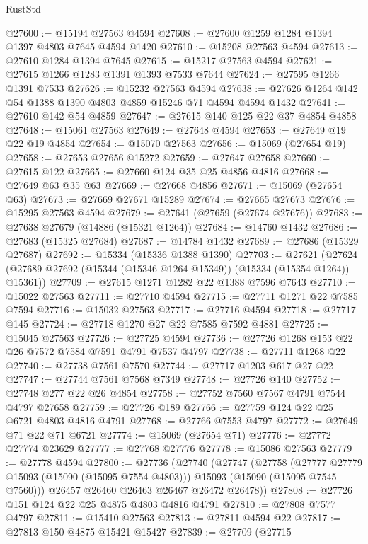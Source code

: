 \begin{lexlean}{RustStd}
\begin{coremodule}
@27600 := @15194 @27563 @4594
@27608 := @27600 @1259 @1284 @1394 @1397 @4803 @7645 @4594 @1420
@27610 := @15208 @27563 @4594
@27613 := @27610 @1284 @1394 @7645
@27615 := @15217 @27563 @4594
@27621 := @27615 @1266 @1283 @1391 @1393 @7533 @7644
@27624 := @27595 @1266 @1391 @7533
@27626 := @15232 @27563 @4594
@27638 := @27626 @1264 @142 @54 @1388 @1390 @4803 @4859 @15246 @71 @4594 @4594 @1432
@27641 := @27610 @142 @54 @4859
@27647 := @27615 @140 @125 @22 @37 @4854 @4858
@27648 := @15061 @27563
@27649 := @27648 @4594
@27653 := @27649 @19 @22 @19 @4854
@27654 := @15070 @27563
@27656 := @15069 (@27654 @19)
@27658 := @27653 @27656 @15272
@27659 := @27647 @27658
@27660 := @27615 @122
@27665 := @27660 @124 @35 @25 @4856 @4816
@27668 := @27649 @63 @35 @63
@27669 := @27668 @4856
@27671 := @15069 (@27654 @63)
@27673 := @27669 @27671 @15289
@27674 := @27665 @27673
@27676 := @15295 @27563 @4594
@27679 := @27641 (@27659 (@27674 @27676))
@27683 := @27638 @27679 (@14886 (@15321 @1264))
@27684 := @14760 @1432
@27686 := @27683 (@15325 @27684)
@27687 := @14784 @1432
@27689 := @27686 (@15329 @27687)
@27692 := @15334 (@15336 @1388 @1390)
@27703 := @27621
    (@27624 (@27689 @27692 (@15344 (@15346 @1264 @15349)) (@15334 (@15354 @1264)) @15361))
@27709 := @27615 @1271 @1282 @22 @1388 @7596 @7643
@27710 := @15022 @27563
@27711 := @27710 @4594
@27715 := @27711 @1271 @22 @7585 @7594
@27716 := @15032 @27563
@27717 := @27716 @4594
@27718 := @27717 @145
@27724 := @27718 @1270 @27 @22 @7585 @7592 @4881
@27725 := @15045 @27563
@27726 := @27725 @4594
@27736 := @27726 @1268 @153 @22 @26 @7572 @7584 @7591 @4791 @7537 @4797
@27738 := @27711 @1268 @22
@27740 := @27738 @7561 @7570
@27744 := @27717 @1203 @617 @27 @22
@27747 := @27744 @7561 @7568 @7349
@27748 := @27726 @140
@27752 := @27748 @277 @22 @26 @4854
@27758 := @27752 @7560 @7567 @4791 @7544 @4797 @27658
@27759 := @27726 @189
@27766 := @27759 @124 @22 @25 @6721 @4803 @4816 @4791
@27768 := @27766 @7553 @4797
@27772 := @27649 @71 @22 @71 @6721
@27774 := @15069 (@27654 @71)
@27776 := @27772 @27774 @23629
@27777 := @27768 @27776
@27778 := @15086 @27563
@27779 := @27778 @4594
@27800 := @27736
    (@27740
      (@27747
        (@27758
          (@27777 @27779 @15093 (@15090 (@15095 @7554 @4803)))
          @15093
          (@15090 (@15095 @7545 @7560)))
        @26457
        @26460
        @26463
        @26467
        @26472
        @26478))
@27808 := @27726 @151 @124 @22 @25 @4875 @4803 @4816 @4791
@27810 := @27808 @7577 @4797
@27811 := @15410 @27563
@27813 := @27811 @4594 @22
@27817 := @27813 @150 @4875 @15421 @15427
@27839 := @27709
    (@27715

\end{coremodule}
\end{lexlean}

